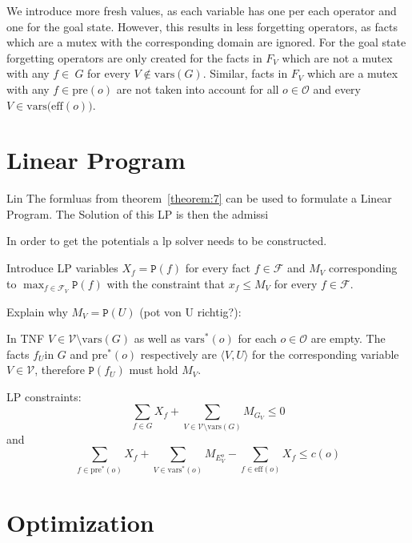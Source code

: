 We introduce more fresh values, as each variable has one per each operator and one for the goal state.
However, this results in less forgetting operators, as facts which are a mutex with the corresponding domain are ignored.
For the goal state forgetting operators are only created for the facts in $F_V$ which are not a mutex with any $f\in\ G$ for every $V\notin\text{vars}(G)$.
Similar, facts in $F_V$ which are a mutex with any $f\in\text{pre}(o)$ are not taken into account for all $o\in\mathcal{O}$ and every $V\in\text{vars(eff}(o))$.

\section{Linear Program}\label{sec:linear-programm}
Lin
The formluas from theorem~\ref{theorem:7} can be used to formulate a Linear Program.
The Solution of this LP is then the admissi

In order to get the potentials a lp solver needs to be constructed.



Introduce LP variables $X_f=\mathtt{P}(f)$ for every fact $f\in\mathcal{F}$ and $M_V$ corresponding to $\max_{f\in\mathcal{F}_V}\mathtt{P}(f)$ with the constraint that $x_f\leq M_V$ for every $f\in\mathcal{F}$.

Explain why $M_V=\mathtt{P}(U)$ (pot von U richtig?):

In TNF $V\in\mathcal{V}\setminus\text{vars}(G)$ as well as $\text{vars}^*(o)$ for each $o\in\mathcal{O}$ are empty.
The facts $f_U$in $G$ and $\text{pre}^*(o)$ respectively are $\langle V,U\rangle$ for the corresponding variable $V\in\mathcal{V}$, therefore $\mathtt{P}(f_U)$ must hold $M_V$.

LP constraints:
\[\sum_{f\in G}X_f+\sum_{V\in\mathcal{V}\setminus\text{vars}(G)}M_{G_V}\leq0\tag{i}\]
and
\[\sum_{f\in\text{pre}^*(o)}X_f+\sum_{V\in\text{vars}^*(o)}M_{E^o_V}-\sum_{f\in\text{eff}(o)}X_f\leq c(o)\tag{ii}\]


\begin{comment}
    \begin{definition}
        Let $f$ be a solution to the following LP:
        Maximize $\mathrm{opt}$ subject to $\sum_{V\in\mathcal{V}}\mathtt{P}_{\langle V, s[V]\rangle}\leq0$ and
        $\sum_{V\in\mathrm{vars(eff}(o))}(\mathtt{P}_{\langle V, \mathrm{pre}(o)[V]\rangle}-\mathtt{P}_{\langle V, \mathrm{eff}(o)[V]\rangle})\leq\mathrm{c}(o)$
        for all $o\in\mathcal{O}$, where the objective function $\athrm{opt}$ can be chosen arbitrarily.
        Then the function $\mathrm{pot}_{\mathrm{opt}}(\langle V,v\rangle)=f()$
    \end{definition}
\end{comment}


\section{Optimization}\label{sec:optimization}


